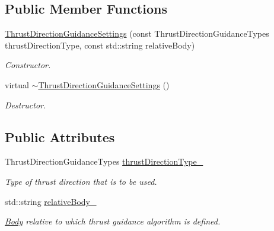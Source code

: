 \subsection*{Public Member Functions}
\begin{DoxyCompactItemize}
\item 
\hyperlink{classtudat_1_1simulation__setup_1_1ThrustDirectionGuidanceSettings_a87d6c99c724f060b0ac88e6324ce6db9}{Thrust\+Direction\+Guidance\+Settings} (const Thrust\+Direction\+Guidance\+Types thrust\+Direction\+Type, const std\+::string relative\+Body)
\begin{DoxyCompactList}\small\item\em Constructor. \end{DoxyCompactList}\item 
virtual \hyperlink{classtudat_1_1simulation__setup_1_1ThrustDirectionGuidanceSettings_af28f900253a9b67ab632766426e950b2}{$\sim$\+Thrust\+Direction\+Guidance\+Settings} ()\hypertarget{classtudat_1_1simulation__setup_1_1ThrustDirectionGuidanceSettings_af28f900253a9b67ab632766426e950b2}{}\label{classtudat_1_1simulation__setup_1_1ThrustDirectionGuidanceSettings_af28f900253a9b67ab632766426e950b2}

\begin{DoxyCompactList}\small\item\em Destructor. \end{DoxyCompactList}\end{DoxyCompactItemize}
\subsection*{Public Attributes}
\begin{DoxyCompactItemize}
\item 
Thrust\+Direction\+Guidance\+Types \hyperlink{classtudat_1_1simulation__setup_1_1ThrustDirectionGuidanceSettings_a223c47bb269a0bbc08b4591c8f10faf9}{thrust\+Direction\+Type\+\_\+}\hypertarget{classtudat_1_1simulation__setup_1_1ThrustDirectionGuidanceSettings_a223c47bb269a0bbc08b4591c8f10faf9}{}\label{classtudat_1_1simulation__setup_1_1ThrustDirectionGuidanceSettings_a223c47bb269a0bbc08b4591c8f10faf9}

\begin{DoxyCompactList}\small\item\em Type of thrust direction that is to be used. \end{DoxyCompactList}\item 
std\+::string \hyperlink{classtudat_1_1simulation__setup_1_1ThrustDirectionGuidanceSettings_a32dddcb978b69c2e932fcd1c2f77e89c}{relative\+Body\+\_\+}\hypertarget{classtudat_1_1simulation__setup_1_1ThrustDirectionGuidanceSettings_a32dddcb978b69c2e932fcd1c2f77e89c}{}\label{classtudat_1_1simulation__setup_1_1ThrustDirectionGuidanceSettings_a32dddcb978b69c2e932fcd1c2f77e89c}

\begin{DoxyCompactList}\small\item\em \hyperlink{classtudat_1_1simulation__setup_1_1Body}{Body} relative to which thrust guidance algorithm is defined. \end{DoxyCompactList}\end{DoxyCompactItemize}


